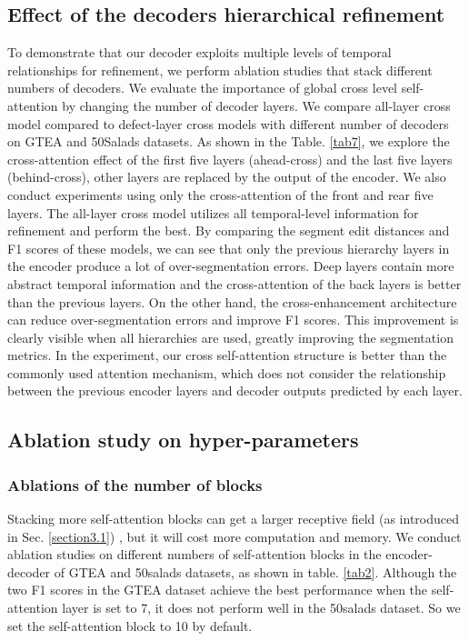 \documentclass[runningheads]{llncs}
\begin{document}
\subsection{Effect of the decoders hierarchical refinement}
\par{
	To demonstrate that our decoder exploits multiple levels of temporal relationships for refinement, we perform ablation studies that stack different numbers of decoders. We evaluate the importance of global cross level self-attention by changing the number of decoder layers. We compare all-layer cross model compared to defect-layer cross models with different number of decoders on GTEA and 50Salads datasets. As shown in the Table. \ref{tab7}, we explore the cross-attention effect of the first five layers (ahead-cross) and the last five layers (behind-cross), other layers are replaced by the output of the encoder. We also conduct experiments using only the cross-attention of the front and rear five layers. The all-layer cross model utilizes all temporal-level information for refinement and perform the best. By comparing the segment edit distances and F1 scores of these models, we can see that only the previous hierarchy layers in the encoder produce a lot of over-segmentation errors. Deep layers contain more abstract temporal information and the cross-attention of the back layers is better than the previous layers. On the other hand, the cross-enhancement architecture can reduce over-segmentation errors and improve F1 scores. This improvement is clearly visible when all hierarchies are used, greatly improving the segmentation metrics. In the experiment, our cross self-attention structure is better than the commonly used attention mechanism, which does not consider the relationship between the previous encoder layers and decoder outputs predicted by each layer.
}
\subsection{Ablation study on hyper-parameters}
\subsubsection{Ablations of the number of blocks}\label{section4.5.1}
\par{
	Stacking more self-attention blocks can get a larger receptive field (as introduced in Sec. \ref{section3.1}) , but it will cost more computation and memory. We conduct ablation studies on different numbers of self-attention blocks in the encoder-decoder of GTEA and 50salads datasets, as shown in table. \ref{tab2}. Although the two F1 scores in the GTEA dataset achieve the best performance when the self-attention layer is set to 7, it does not perform well in the 50salads dataset. So we set the self-attention block to 10 by default.
}
\end{document}
